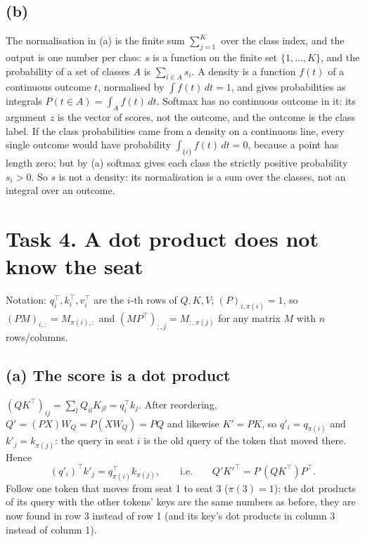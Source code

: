 \subsection*{(b)}
The normalisation in (a) is the finite sum $\sum_{j=1}^K$ over the class index, and the output is one number per class:
$s$ is a function on the finite set $\{1,\dots,K\}$, and the probability of a set of classes $A$ is $\sum_{i\in A}s_i$.
A density is a function $f(t)$ of a continuous outcome $t$, normalised by $\int f(t)\,dt=1$, and gives probabilities as
integrals $P(t\in A)=\int_A f(t)\,dt$. Softmax has no continuous outcome in it: its argument $z$ is the vector of scores,
not the outcome, and the outcome is the class label. If the class probabilities came from a density on a continuous
line, every single outcome would have probability $\int_{\{i\}}f(t)\,dt=0$, because a point has length zero; but by (a)
softmax gives each class the strictly positive probability $s_i>0$. So $s$ is not a density: its normalisation is a sum
over the classes, not an integral over an outcome.

\section*{Task 4. A dot product does not know the seat}
Notation: $q_i^\top, k_i^\top, v_i^\top$ are the $i$-th rows of $Q,K,V$; $(P)_{i,\pi(i)}=1$, so $(PM)_{i,:}=M_{\pi(i),:}$ and
$(MP^\top)_{:,j}=M_{:,\pi(j)}$ for any matrix $M$ with $n$ rows/columns.

\subsection*{(a) The score is a dot product}
$(QK^\top)_{ij}=\sum_{l}Q_{il}K_{jl}=q_i^\top k_j$. After reordering, $Q'=(PX)W_Q=P(XW_Q)=PQ$ and likewise $K'=PK$, so
$q'_i=q_{\pi(i)}$ and $k'_j=k_{\pi(j)}$: the query in seat $i$ is the old query of the token that moved there. Hence
\[
(q'_i)^\top k'_j=q_{\pi(i)}^\top k_{\pi(j)},\qquad\text{i.e.}\qquad Q'K'^\top=P\,(QK^\top)P^\top .
\]
Follow one token that moves from seat 1 to seat 3 ($\pi(3)=1$): the dot products of its query with the other tokens' keys are
the same numbers as before, they are now found in row 3 instead of row 1 (and its key's dot products in column 3 instead of column 1).

